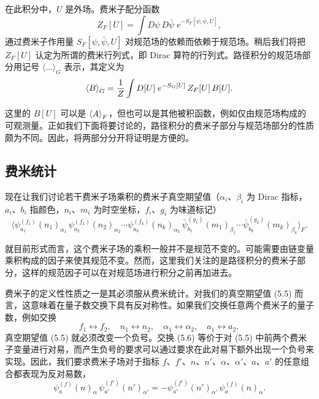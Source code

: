 在此积分中，$U$ 是外场。费米子配分函数
\begin{equation}
  Z_F[U] = \int D\psi\,D\bar{\psi}\; e^{-S_F[\psi,\bar{\psi},U]} ,
\end{equation}
通过费米子作用量 $S_F[\psi,\bar{\psi},U]$ 对规范场的依赖而依赖于规范场。稍后我们将把 $Z_F[U]$ 认定为所谓的费米行列式，即 Dirac 算符的行列式。路径积分的规范场部分用记号 $\langle\ldots\rangle_G$ 表示，其定义为
\begin{equation}
  \left\langle B \right\rangle_G = \frac{1}{Z}\int D[U]\; e^{-S_G[U]}\,Z_F[U]\,B[U] .
\end{equation}

这里的 $B[U]$ 可以是 $\left\langle A \right\rangle_F$，但也可以是其他被积函数，例如仅由规范场构成的可观测量。正如我们下面将要讨论的，路径积分的费米子部分与规范场部分的性质颇为不同。因此，将两部分分开将证明是方便的。

\subsection{费米统计}

现在让我们讨论若干费米子场乘积的费米子真空期望值（$\alpha_i$、$\beta_i$ 为 Dirac 指标，$a_i$、$b_i$ 指颜色，$n_i$、$m_i$ 为时空坐标，$f_i$、$g_i$ 为味道标记）
\begin{equation}
  \Big\langle
    \psi^{(f_1)}_{a_1}(n_1)_{\alpha_1}\,
    \psi^{(f_2)}_{a_2}(n_2)_{\alpha_2}\cdots
    \psi^{(f_k)}_{a_k}(n_k)_{\alpha_k}\,
    \bar{\psi}^{(g_1)}_{b_1}(m_1)_{\beta_1}\cdots
    \bar{\psi}^{(g_k)}_{b_k}(m_k)_{\beta_k}
  \Big\rangle_F .
\end{equation}

就目前形式而言，这个费米子场的乘积一般并不是规范不变的。可能需要由链变量乘积构成的因子来使其规范不变。然而，这里我们关注的是路径积分的费米子部分，这样的规范因子可以在对规范场进行积分之前再加进去。

费米子的定义性性质之一是其必须服从费米统计。对我们的真空期望值 (5.5) 而言，这意味着在量子数交换下具有反对称性。如果我们交换任意两个费米子的量子数，例如交换
\begin{equation}
  f_1 \leftrightarrow f_2, \quad n_1 \leftrightarrow n_2, \quad
  \alpha_1 \leftrightarrow \alpha_2, \quad a_1 \leftrightarrow a_2,
\end{equation}
真空期望值 (5.5) 就必须改变一个负号。交换 (5.6) 等价于对 (5.5) 中前两个费米子变量进行对易，而产生负号的要求可以通过要求在此对易下额外出现一个负号来实现。因此，我们要求费米子场对于指标 $f$、$f'$、$n$、$n'$、$\alpha$、$\alpha'$、$a$、$a'$ 的任意组合都表现为反对易数，
\begin{equation}
  \psi^{(f)}_{a}(n)_{\alpha}\,
  \psi^{(f')}_{a'}(n')_{\alpha'}
  = -\psi^{(f')}_{a'}(n')_{\alpha'}\,
  \psi^{(f)}_{a}(n)_{\alpha} .
\end{equation}

